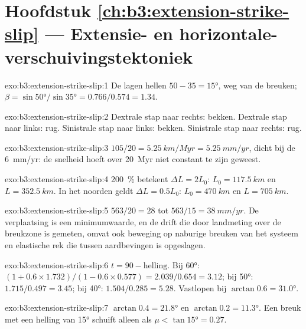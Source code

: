 \section*{Hoofdstuk \ref{ch:b3:extension-strike-slip} --- Extensie- en horizontale-verschuivingstektoniek}

\begin{solution}{exo:b3:extension-strike-slip:1}
De lagen hellen $50 - 35 = \ang{15}$, weg van de breuken; $\beta =
\sin\ang{50}/\sin\ang{35} = 0.766/0.574 = 1.34$.
\end{solution}

\begin{solution}{exo:b3:extension-strike-slip:2}
Dextrale stap naar rechts: bekken. Dextrale stap naar links: rug. Sinistrale
stap naar links: bekken. Sinistrale stap naar rechts: rug.
\end{solution}

\begin{solution}{exo:b3:extension-strike-slip:3}
$105/20 = \qty{5.25}{km/Myr} = \qty{5.25}{mm/yr}$, dicht bij de
\qty{6}{mm/yr}: de snelheid hoeft over \qty{20}{Myr} niet constant te zijn geweest.
\end{solution}

\begin{solution}{exo:b3:extension-strike-slip:4}
\qty{200}{\percent} betekent $\Delta L = 2L_0$: $L_0 = \qty{117.5}{km}$ en $L
= \qty{352.5}{km}$. In het noorden geldt $\Delta L = 0.5L_0$: $L_0 = \qty{470}{km}$
en $L = \qty{705}{km}$.
\end{solution}

\begin{solution}{exo:b3:extension-strike-slip:5}
$563/20 = 28$ tot $563/15 = \qty{38}{mm/yr}$. De verplaatsing is een minimumwaarde, en
de drift die door landmeting over de breukzone is gemeten, omvat ook beweging op
naburige breuken van het systeem en elastische rek die tussen
aardbevingen is opgeslagen.
\end{solution}

\begin{solution}{exo:b3:extension-strike-slip:6}
$t = 90 - \text{helling}$. Bij \ang{60}: $(1 + 0.6\times1.732)/(1 - 0.6\times
0.577) = 2.039/0.654 = 3.12$; bij \ang{50}: $1.715/0.497 = 3.45$; bij
\ang{40}: $1.504/0.285 = 5.28$. Vastlopen bij $\arctan0.6 = \ang{31.0}$.
\end{solution}

\begin{solution}{exo:b3:extension-strike-slip:7}
$\arctan0.4 = \ang{21.8}$ en $\arctan0.2 = \ang{11.3}$. Een breuk met een helling van
\ang{15} schuift alleen als $\mu < \tan\ang{15} = 0.27$.
\end{solution}

